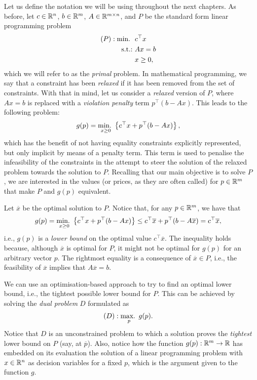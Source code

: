 Let us define the notation we will be using throughout the next chapters. As before, let $c \in \mathbb{R}^n$, $b \in \mathbb{R}^m$, $A \in \mathbb{R}^{m \times n}$, and $P$ be the standard form linear programming problem
%
\begin{align*}
	(P) : \mathop{\text{min.~}} \ & c^\top x \\
	\mathop{\text{s.t.:~}} 	  & Ax = b \\
		  & x \geq 0,   
\end{align*}
%
which we will refer to as the \emph{primal} problem. In mathematical programming, we say that a constraint has been \emph{relaxed} if it has been removed from the set of constraints. With that in mind, let us consider a \emph{relaxed} version of $P$, where $Ax = b$ is replaced with a \emph{violation penalty} term $p^\top (b - Ax)$. This leads to the following problem:
%
\begin{equation*}
	g(p) = \mathop{\text{min.~}}_{x \geq 0} \left\{ c^\top x + p^\top (b - Ax) \right \},
\end{equation*}
%
which has the benefit of not having equality constraints explicitly represented, but only implicit by means of a penalty term. This term is used to penalise the infeasibility of the constraints in the attempt to steer the solution of the relaxed problem towards the solution to $P$. Recalling that our main objective is to solve $P$, we are interested in the values (or prices, as they are often called) for $p \in \mathbb{R}^m$ that make $P$ and $g(p)$ equivalent.

Let $\overline{x}$ be the optimal solution to $P$. Notice that, for any $p \in \mathbb{R}^m$, we have that
%
\begin{equation*}
	g(p) = \mathop{\text{min.~}}_{x \geq 0} \left\{ c^\top x + p^\top (b - Ax) \right \} \leq c^\top \overline{x} +  p^\top (b - A\overline{x}) = c^\top \overline{x},   
\end{equation*}
%
i.e., $g(p)$ is a \emph{lower bound} on the optimal value $c^\top \overline{x}$. The inequality holds because, although $\overline{x}$ is optimal for $P$, it might not be optimal for $g(p)$ for an arbitrary vector $p$. The rightmost equality is a consequence of $\overline{x} \in P$, i.e., the feasibility of $\overline{x}$ implies that $A\overline{x} = b$.

We can use an optimisation-based approach to try to find an optimal lower bound, i.e., the tightest possible lower bound for $P$. This can be achieved by solving the \emph{dual problem} $D$ formulated as 
%
\begin{equation*}
	(D) : \mathop{\text{max.~}}_p g(p).
\end{equation*}
%
Notice that $D$ is an unconstrained problem to which a solution proves the \emph{tightest} lower bound on $P$ (say, at $\overline{p}$). Also, notice how the function $g(p) : \mathbb{R}^m \to \mathbb{R}$ has embedded on its evaluation the solution of a linear programming problem with $x \in \mathbb{R}^n$ as decision variables for a fixed $p$, which is the argument given to the function $g$. %

